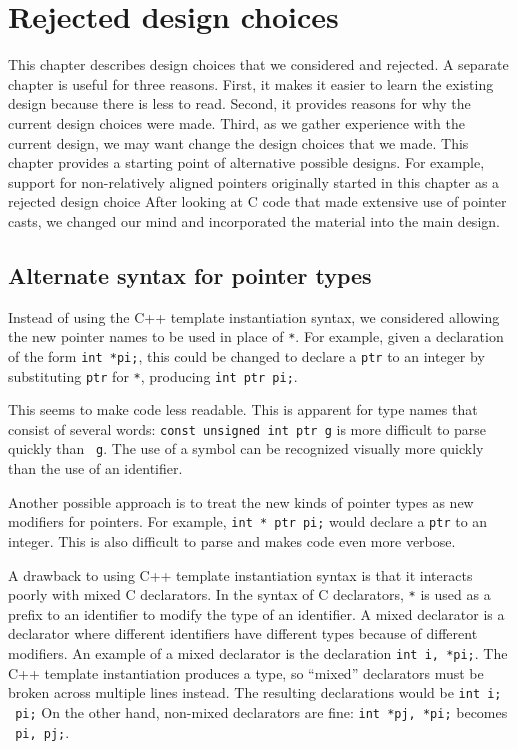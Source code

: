 
\chapter{Rejected design choices}
\label{chapter:design-alternatives}

This chapter describes design choices that we considered and rejected.
A separate chapter is useful for three reasons.   First, it makes it 
easier to learn the existing design because there is less to read.
Second, it provides reasons for why the current
design choices were made.  Third, as we gather experience with the current
design, we may want change the design choices that we made. 
This chapter provides a starting point 
of alternative possible designs.  For example, support for non-relatively 
aligned pointers originally started in this chapter as a rejected design choice 
After looking at C code that
made extensive use of pointer casts, we changed our mind and incorporated
the material into the main design.

\section{Alternate syntax for pointer types}
\label{section:alternate-pointer-type-syntax}

Instead of using the C++ template instantiation syntax, we
considered allowing the new pointer names to be used in place of \texttt{*}.
For example, given a declaration of the form \texttt{int *pi;}, this could be changed
to declare a \texttt{ptr} to an integer by substituting \texttt{ptr} for \texttt{*},
producing \texttt{int ptr pi;}.
  
This seems to make code less readable.  This is apparent for type names that 
consist of several words: \texttt{const unsigned int ptr g} is more
difficult to parse quickly than \texttt{ g}.
The use of a symbol can be recognized visually more quickly than the use 
of an identifier.  

Another possible approach is to treat the new kinds
of pointer types  as new modifiers for pointers.  For example, 
\texttt{int * ptr pi;} would declare a \texttt{ptr} to an integer. This is 
also difficult to parse and makes code even more verbose.

A drawback to using C++ template instantiation syntax is that it interacts
poorly with mixed C declarators. In the syntax of C declarators, \texttt{*} is used as
a prefix to an identifier to modify the type of an identifier. A mixed
declarator is a declarator where different identifiers have different
types because of different modifiers. An example of a mixed declarator
is the declaration \texttt{int i, *pi;}. The C++ template instantiation produces a
type, so ``mixed'' declarators must be broken across multiple
lines instead. The resulting declarations would be 
\texttt{int i; \ptrint\ pi;} On the other hand, non-mixed
declarators are fine: \texttt{int *pj, *pi;} becomes
\texttt{\ptrint\ pi, pj;}.

